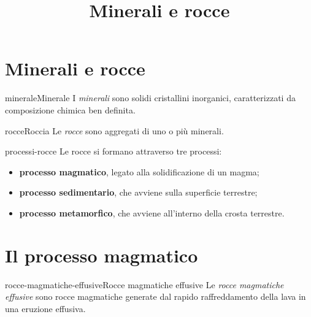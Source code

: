 \documentclass[preview]{standalone}
\begin{document}
\title{Minerali e rocce}
\genpage

\section{Minerali e rocce}

\begin{snippetdefinition}{minerale}{Minerale}
    I \textit{minerali} sono solidi cristallini inorganici, caratterizzati da composizione chimica ben definita.
\end{snippetdefinition}

\begin{snippetdefinition}{rocce}{Roccia}
    Le \textit{rocce} sono aggregati di uno o più minerali.
\end{snippetdefinition}

\begin{snippet}{processi-rocce}
    Le rocce si formano attraverso tre processi:
    \begin{itemize}
        \item \textbf{processo magmatico}, legato alla solidificazione di un magma;
        \item \textbf{processo sedimentario}, che avviene sulla superficie terrestre;
        \item \textbf{processo metamorfico}, che avviene all'interno della crosta terrestre.
    \end{itemize}
\end{snippet}

\section{Il processo magmatico}


\begin{snippetdefinition}{rocce-magmatiche-effusive}{Rocce magmatiche effusive}
    Le \textit{rocce magmatiche effusive} sono rocce magmatiche generate dal rapido raffreddamento
    della lava in una eruzione effusiva.
\end{snippetdefinition}
\end{document}

